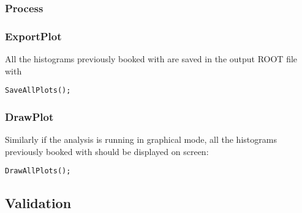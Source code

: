 \subsubsection{Process}

\subsubsection{ExportPlot}
All the histograms previously booked with  are saved in the output ROOT file with

\begin{lstlisting}
SaveAllPlots();
\end{lstlisting} 

\subsubsection{DrawPlot}
Similarly if the analysis is running in graphical mode, all the histograms previously booked with
 should be displayed on screen:

\begin{lstlisting}
DrawAllPlots();
\end{lstlisting} 

\subsection{Validation}
